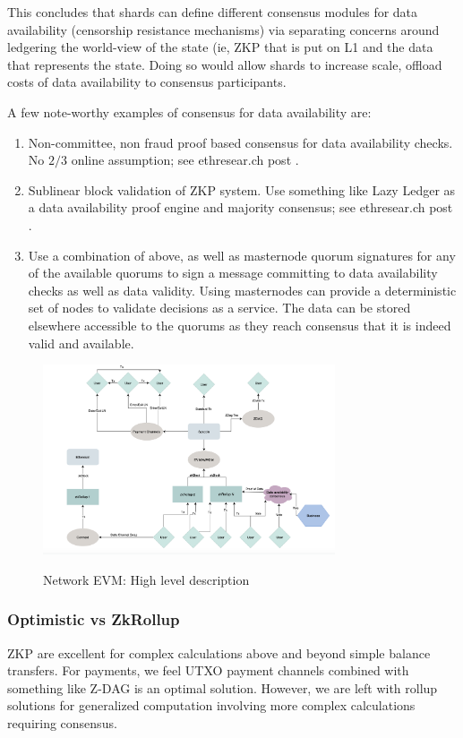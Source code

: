 \documentclass[peerreview]{ieeesyscoin}
\begin{document}
This concludes that shards can define different consensus modules for data availability (censorship resistance mechanisms) via separating concerns around ledgering the world-view of the state (ie, ZKP that is put on L1 and the data that represents the state. Doing so would allow shards to increase scale, offload costs of data availability to consensus participants.

A few note-worthy examples of consensus for data availability are:

\begin{enumerate}
\item Non-committee, non fraud proof based consensus for data availability checks. No $2/3$ online assumption; see ethresear.ch post \cite{But20}. 
\item Sublinear block validation of ZKP system. Use something like Lazy Ledger as a data availability proof engine and majority consensus; see ethresear.ch post \cite{Al20}. 
\item Use a combination of above, as well as masternode quorum signatures for any of the available quorums to sign a message committing to data availability checks as well as data validity. Using masternodes can provide a deterministic set of nodes to validate decisions as a service. The data can be stored elsewhere accessible to the quorums as they reach consensus that it is indeed valid and available.
\end{enumerate}


\begin{figure}[h!]
\includegraphics[width=3.4in]{img/nevm.png}
\label{fig:nevm}
\caption{Network EVM: High level description} 
\end{figure} 

\subsubsection{Optimistic vs ZkRollup}

ZKP are excellent for complex calculations above and beyond simple balance transfers. For payments, we feel UTXO payment channels combined with something like Z-DAG is an optimal solution. However, we are left with rollup solutions for generalized computation involving more complex calculations requiring consensus.
\end{document}
